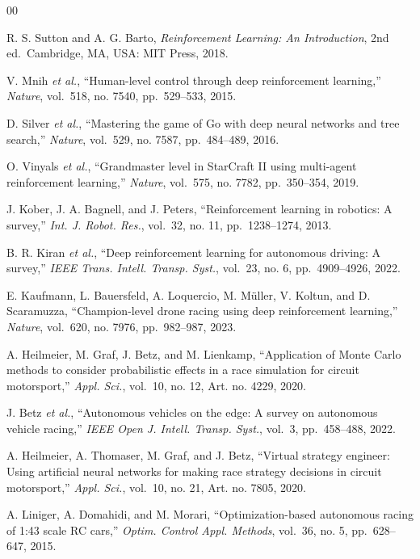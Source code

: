 \documentclass{ieeeaccess}
\begin{document}
\begin{thebibliography}{00}

 R. S. Sutton and A. G. Barto, \emph{Reinforcement Learning: An Introduction}, 2nd ed.~Cambridge, MA, USA: MIT Press, 2018.

 V. Mnih \emph{et al.}, ``Human-level control through deep reinforcement learning,'' \emph{Nature}, vol.~518, no. 7540, pp.~529--533, 2015.

 D. Silver \emph{et al.}, ``Mastering the game of Go with deep neural networks and tree search,'' \emph{Nature}, vol.~529, no. 7587, pp.~484--489, 2016.

 O. Vinyals \emph{et al.}, ``Grandmaster level in StarCraft II using multi-agent reinforcement learning,'' \emph{Nature}, vol.~575, no. 7782, pp.~350--354, 2019.

 J. Kober, J. A. Bagnell, and J. Peters, ``Reinforcement learning in robotics: A survey,'' \emph{Int. J. Robot. Res.}, vol.~32, no. 11, pp.~1238--1274, 2013.

 B. R. Kiran \emph{et al.}, ``Deep reinforcement learning for autonomous driving: A survey,'' \emph{IEEE Trans. Intell. Transp. Syst.}, vol.~23, no. 6, pp.~4909--4926, 2022.

 E. Kaufmann, L. Bauersfeld, A. Loquercio, M. Müller, V. Koltun, and D. Scaramuzza, ``Champion-level drone racing using deep reinforcement learning,'' \emph{Nature}, vol.~620, no. 7976, pp.~982--987, 2023.

 A. Heilmeier, M. Graf, J. Betz, and M. Lienkamp, ``Application of Monte Carlo methods to consider probabilistic effects in a race simulation for circuit motorsport,'' \emph{Appl. Sci.}, vol.~10, no. 12, Art. no. 4229, 2020.

 J. Betz \emph{et al.}, ``Autonomous vehicles on the edge: A survey on autonomous vehicle racing,'' \emph{IEEE Open J. Intell. Transp. Syst.}, vol.~3, pp.~458--488, 2022.

 A. Heilmeier, A. Thomaser, M. Graf, and J. Betz, ``Virtual strategy engineer: Using artificial neural networks for making race strategy decisions in circuit motorsport,'' \emph{Appl. Sci.}, vol.~10, no. 21, Art. no. 7805, 2020.

 A. Liniger, A. Domahidi, and M. Morari, ``Optimization-based autonomous racing of 1:43 scale RC cars,'' \emph{Optim. Control Appl. Methods}, vol.~36, no. 5, pp.~628--647, 2015.


\end{thebibliography}
\end{document}
